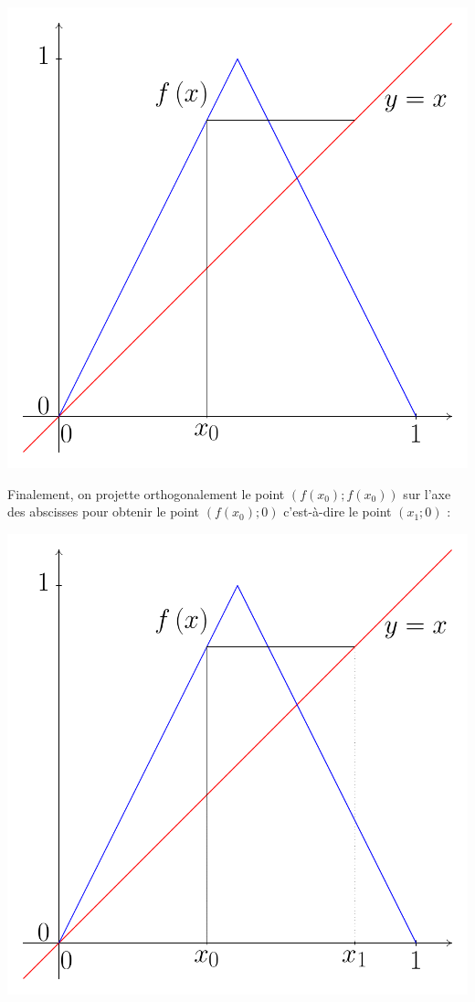 \documentclass[a4paper,french,12pt]{article}
\begin{document}
\begin{center}
\includegraphics[scale=0.45]{../TeXGraph/Pdf/courbe_suite_intersection.pdf}
\end{center}
Finalement, on projette orthogonalement le point $\left(f\left(x_0\right);f\left(x_0\right)\right)$ sur l'axe des abscisses pour obtenir le point $\left(f\left(x_0\right);0\right)$ c'est-à-dire le point $\left(x_1;0\right)$ :

\begin{center}
\includegraphics[scale=0.45]{../TeXGraph/Pdf/courbe_suite_x_1.pdf}
\end{center}
\end{document}
